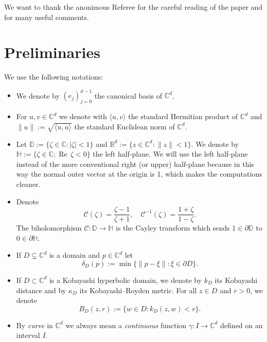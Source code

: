 \documentclass[11pt, reqno]{amsart}
\numberwithin{equation}{section}
\theoremstyle{definition}
\newcommand{\C}{\mathbb{C}}
\newcommand{\D}{\mathbb{D}}
\newcommand{\B}{\mathbb{B}}
\renewcommand{\H}{\mathbb{H}}
\renewcommand{\Re}{{\operatorname{Re}\,}}
\begin{document}
	 We want to thank  the anonimous Referee for the careful reading of the paper and for many useful comments.
	
	\section{Preliminaries}
	
	We use the following notations:
	\begin{itemize}
		\item We denote by $(e_j)_{j=0}^{d-1}$ the canonical basis of $\C^d$.
		\item For $u,v\in\C^d$ we denote with $\langle u,v\rangle$ the standard Hermitian product of $\C^d$ and $\|u
		\|:=\sqrt{\langle u,u\rangle}$ the  standard Euclidean norm of $\C^d$.
		\item Let $\D:=\{\zeta\in\C:|\zeta|<1\}$ and $\B^d:=\{z\in\C^d:\|z\|<1\}.$ We denote by $\H:=\{\zeta\in\C:\Re\zeta<0\}$ the left half-plane. We will use the left half-plane instead of the more conventional right (or upper) half-plane because in this way  the normal outer vector at the origin is 1, which makes the computations cleaner.
		\item Denote $$\mathscr{C}(\zeta)=\frac{\zeta-1}{\zeta+1},\quad \mathscr{C}^{-1}(\zeta)=\frac{1+\zeta}{1-\zeta}.$$
		The biholomorphism  $\mathscr{C}\colon\D\to\H$ is the Cayley transform which sends $1\in\partial\D$ to $0\in\partial\H$.
		\item If $D\subsetneq\C^d$ is a domain and $p\in\C^d$ let  
		$$\delta_D(p):=\min\{\|p-\xi\|:\xi\in\partial D\}.$$
		\item If $D\subset \C^d$ is a Kobayashi hyperbolic domain, we denote by $k_D$ its Kobayashi distance and by $\kappa_D$ its Kobayashi--Royden metric. For all $z\in D$ and $r>0$, we denote 
		$$B_D(z,r):=\{w\in D:k_D(z,w)<r\}.$$
		\item By {\sl curve} in $\C^d$ we always mean a \emph{continuous} function $\gamma\colon I\to \C^d$ defined on an interval $I$.
	\end{itemize}
	
\end{document}

